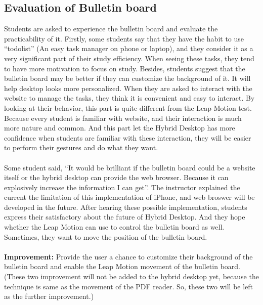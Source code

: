 \subsection{Evaluation of Bulletin board}
Students are asked to experience the bulletin board and evaluate the practicability of it. Firstly, some students say that they have the habit to use “todolist” (An easy task manager on phone or laptop), and they consider it as a very significant part of their study efficiency. When seeing these tasks, they tend to have more motivation to focus on study. Besides, students suggest that the bulletin board may be better if they can customize the background of it. It will help desktop looks more personalized. When they are asked to interact with the website to manage the tasks, they think it is convenient and easy to interact. By looking at their behavior, this part is quite different from the Leap Motion test. Because every student is familiar with website, and their interaction is much more nature and common. And this part let the Hybrid Desktop has more confidence when students are familiar with these interaction, they will be easier to perform their gestures and do what they want. 
\\
\\
Some student said, “It would be brilliant if the bulletin board could be a website itself or the hybrid desktop can provide the web browser. Because it can explosively increase the information I can get”. The instructor explained the current the limitation of this implementation of iPhone, and web broswer will be developed in the future. After hearing these possible implementation, students express their satisfactory about the future of Hybrid Desktop. And they hope whether the Leap Motion can use to control the bulletin board as well. Sometimes, they want to move the position of the bulletin board.
\\
\\
\textbf{Improvement:} Provide the user a chance to customize their background of the bulletin board and enable the Leap Motion movement of the bulletin board. (These two improvement will not be added to the hybrid desktop yet, because the technique is same as the movement of the PDF reader. So, these two will be left as the further improvement.)

